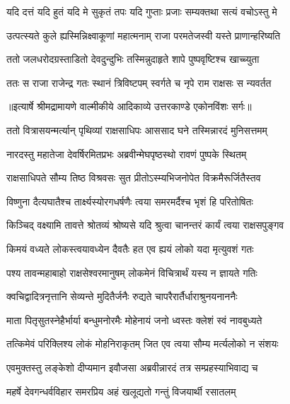 \twolineshloka
{यदि दत्तं यदि हुतं यदि मे सुकृतं तपः}
{यदि गुप्ताः प्रजाः सम्यक्तथा सत्यं वचोऽस्तु मे} %

\twolineshloka
{उत्पत्स्यते कुले ह्यस्मिन्निक्ष्वाकूणां महात्मनाम्}
{राजा परमतेजस्वी यस्ते प्राणान्हरिष्यति} %

\twolineshloka
{ततो जलधरोदग्रस्ताडितो देवदुन्दुभिः}
{तस्मिन्नुदाहृते शापे पुष्पवृष्टिश्च खाच्च्युता} %

\twolineshloka
{ततः स राजा राजेन्द्र गतः स्थानं त्रिविष्टपम्}
{स्वर्गते च नृपे राम राक्षसः स न्यवर्तत} %


{॥इत्यार्षे श्रीमद्रामायणे वाल्मीकीये आदिकाव्ये उत्तरकाण्डे एकोनविंशः सर्गः॥}


\twolineshloka
{ततो वित्रासयन्मर्त्यान् पृथिव्यां राक्षसाधिपः}
{आससाद घने तस्मिन्नारदं मुनिसत्तमम्} %

\twolineshloka
{नारदस्तु महातेजा देवर्षिरमितप्रभः}
{अब्रवीन्मेघपृष्ठस्थो रावणं पुष्पके स्थितम्} %

\twolineshloka
{राक्षसाधिपते सौम्य तिष्ठ विश्रवसः सुत}
{प्रीतोऽस्म्यभिजनोपेत विक्रमैरूर्जितैस्तव} %

\twolineshloka
{विष्णुना दैत्यघातैश्च तार्क्ष्यस्योरगधर्षणैः}
{त्वया समरमर्दैश्च भृशं हि परितोषितः} %

\twolineshloka
{किञ्चिद् वक्ष्यामि तावत्ते श्रोतव्यं श्रोष्यसे यदि}
{श्रुत्वा चानन्तरं कार्यं त्वया राक्षसपुङ्गव} %

\twolineshloka
{किमयं वध्यते लोकस्त्वयावध्येन दैवतैः}
{हत एव ह्ययं लोको यदा मृत्युवशं गतः} %

\twolineshloka
{पश्य तावन्महाबाहो राक्षसेश्वरमानुषम्}
{लोकमेनं विचित्रार्थं यस्य न ज्ञायते गतिः} %

\twolineshloka
{क्वचिद्वादित्रनृत्तानि सेव्यन्ते मुदितैर्जनैः}
{रुद्यते चापरैरार्तैर्धाराश्रुनयनाननैः} %

\twolineshloka
{माता पितृसुतस्नेहैर्भार्या बन्धुमनोरमैः}
{मोहेनायं जनो ध्वस्तः क्लेशं स्वं नावबुध्यते} %

\twolineshloka
{तत्किमेवं परिक्लिश्य लोकं मोहनिराकृतम्}
{जित एव त्वया सौम्य मर्त्यलोको न संशयः} %

\twolineshloka
{एवमुक्तस्तु लङ्केशो दीप्यमान इवौजसा}
{अब्रवीन्नारदं तत्र सम्प्रहस्याभिवाद्य च} %

\twolineshloka
{महर्षे देवगन्धर्वविहार समरप्रिय}
{अहं खलूद्यतो गन्तुं विजयार्थी रसातलम्} %

